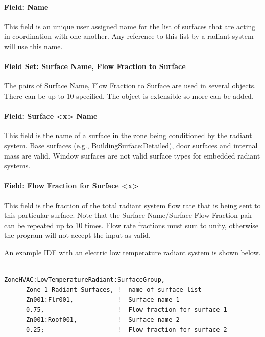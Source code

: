 \paragraph{Field: Name}\label{field-name-8-015}

This field is an unique user assigned name for the list of surfaces that are acting in coordination with one another. Any reference to this list by a radiant system will use this name.

\paragraph{Field Set: Surface Name, Flow Fraction to Surface}\label{field-set-surface-name-flow-fraction-to-surface}

The pairs of Surface Name, Flow Fraction to Surface are used in several objects. There can be up to 10 specified. The object is extensible so more can be added.

\paragraph{Field: Surface \textless{}x\textgreater{} Name}\label{field-surface-x-name-2}

This field is the name of a surface in the zone being conditioned by the radiant system. Base surfaces (e.g., \hyperref[buildingsurfacedetailed]{BuildingSurface:Detailed}), door surfaces and internal mass are valid. Window surfaces are not valid surface types for embedded radiant systems.

\paragraph{Field: Flow Fraction for Surface \textless{}x\textgreater{}}\label{field-flow-fraction-for-surface-x}

This field is the fraction of the total radiant system flow rate that is being sent to this particular surface. Note that the Surface Name/Surface Flow Fraction pair can be repeated up to 10 times. Flow rate fractions must sum to unity, otherwise the program will not accept the input as valid.

An example IDF with an electric low temperature radiant system is shown below.

\begin{lstlisting}

ZoneHVAC:LowTemperatureRadiant:SurfaceGroup,
      Zone 1 Radiant Surfaces, !- name of surface list
      Zn001:Flr001,            !- Surface name 1
      0.75,                    !- Flow fraction for surface 1
      Zn001:Roof001,           !- Surface name 2
      0.25;                    !- Flow fraction for surface 2
\end{lstlisting}

